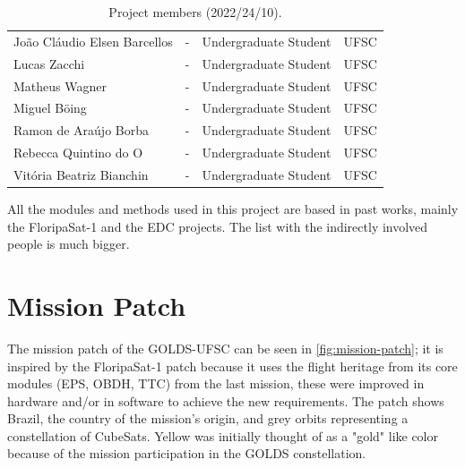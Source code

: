 \begin{table}[!htb]
\begin{tabular}{lllc}
        João Cláudio Elsen Barcellos        & -         & Undergraduate Student & UFSC \\
        Lucas Zacchi                        & -         & Undergraduate Student & UFSC \\
        Matheus Wagner                      & -         & Undergraduate Student & UFSC \\
        Miguel Böing                        & -         & Undergraduate Student & UFSC \\
        Ramon de Araújo Borba               & -         & Undergraduate Student & UFSC \\
        Rebecca Quintino do O               & -         & Undergraduate Student & UFSC \\
        Vitória Beatriz Bianchin            & -         & Undergraduate Student & UFSC \\
        \bottomrule[1.5pt]
    \end{tabular}
    \caption{Project members (2022/24/10).}
    \label{tab:team-members}
\end{table}

All the modules and methods used in this project are based in past works, mainly the FloripaSat-1 and the EDC projects. The list with the indirectly involved people is much bigger.

\section{Mission Patch}

The mission patch of the GOLDS-UFSC can be seen in \autoref{fig:mission-patch}; it is inspired by the FloripaSat-1 patch \cite{floripasat} because it uses the flight heritage from its core modules (EPS, OBDH, TTC) from the last mission, these were improved in hardware and/or in software to achieve the new requirements. The patch shows Brazil, the country of the mission's origin, and grey orbits representing a constellation of CubeSats. Yellow was initially thought of as a "gold" like color because of the mission participation in the GOLDS constellation.

